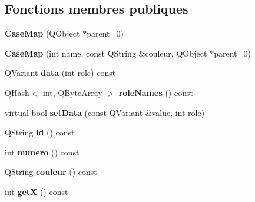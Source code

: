 \subsection*{Fonctions membres publiques}
\begin{DoxyCompactItemize}
\item 
{\bfseries Case\+Map} (Q\+Object $\ast$parent=0)\hypertarget{class_case_map_a2ce2f7eac32d04d1a3dd7bae6bfe49ef}{}\label{class_case_map_a2ce2f7eac32d04d1a3dd7bae6bfe49ef}

\item 
{\bfseries Case\+Map} (int name, const Q\+String \&couleur, Q\+Object $\ast$parent=0)\hypertarget{class_case_map_aa5992fb9f94916df679ba8924af1b402}{}\label{class_case_map_aa5992fb9f94916df679ba8924af1b402}

\item 
Q\+Variant {\bfseries data} (int role) const \hypertarget{class_case_map_aafb940559c3da7617a60d7e3c2c97b09}{}\label{class_case_map_aafb940559c3da7617a60d7e3c2c97b09}

\item 
Q\+Hash$<$ int, Q\+Byte\+Array $>$ {\bfseries role\+Names} () const \hypertarget{class_case_map_ae153e63fe7431386e61ea5993cf49099}{}\label{class_case_map_ae153e63fe7431386e61ea5993cf49099}

\item 
virtual bool {\bfseries set\+Data} (const Q\+Variant \&value, int role)\hypertarget{class_case_map_a1688bc1912122dfd309291a8e0596b95}{}\label{class_case_map_a1688bc1912122dfd309291a8e0596b95}

\item 
Q\+String {\bfseries id} () const \hypertarget{class_case_map_a787acbbce262bde9dca4fcd7c972c641}{}\label{class_case_map_a787acbbce262bde9dca4fcd7c972c641}

\item 
int {\bfseries numero} () const \hypertarget{class_case_map_a0e1a619a998369d054eca67d1b2035cb}{}\label{class_case_map_a0e1a619a998369d054eca67d1b2035cb}

\item 
Q\+String {\bfseries couleur} () const \hypertarget{class_case_map_a207917b31551bf6145598092f01abe0f}{}\label{class_case_map_a207917b31551bf6145598092f01abe0f}

\item 
int {\bfseries getX} () const \hypertarget{class_case_map_a65bd8c7a90488546b7a44da2a2a370b0}{}\label{class_case_map_a65bd8c7a90488546b7a44da2a2a370b0}


\end{DoxyCompactItemize}
